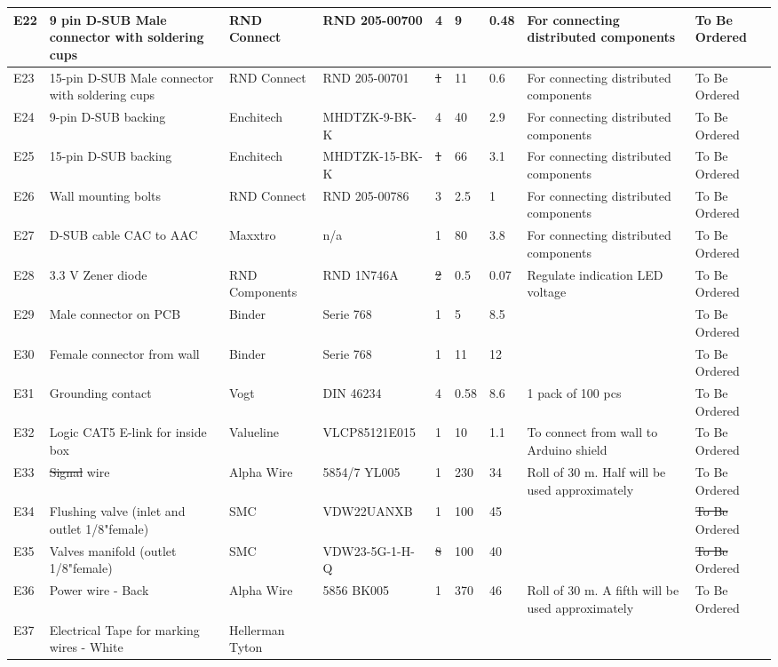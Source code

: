 \documentclass[a4paper,12pt,twoside]{article}
\providecommand{\DIFaddtex}[1]{{\protect\color{blue}\uwave{#1}}} %
\providecommand{\DIFdeltex}[1]{{\protect\color{red}\sout{#1}}}                      %
\providecommand{\DIFaddbegin}{} %
\providecommand{\DIFaddend}{} %
\providecommand{\DIFdelbegin}{} %
\providecommand{\DIFdelend}{} %
\providecommand{\DIFadd}[1]{\texorpdfstring{\DIFaddtex{#1}}{#1}} %
\providecommand{\DIFdel}[1]{\texorpdfstring{\DIFdeltex{#1}}{}} %
\newcommand{\DIFscaledelfig}{0.5}
\newlength{\DIFdelgraphicswidth} %
\newlength{\DIFdelgraphicsheight} %
\newcommand{\DIFaddincludegraphics}[2][]{{\color{blue}\fbox{\DIFOincludegraphics[#1]{#2}}}} %
\newcommand{\DIFdelincludegraphics}[2][]{%
\sbox{\DIFdelgraphicsbox}{\DIFOincludegraphics[#1]{#2}}%
\settoboxwidth{\DIFdelgraphicswidth}{\DIFdelgraphicsbox} %
\settoboxtotalheight{\DIFdelgraphicsheight}{\DIFdelgraphicsbox} %
\scalebox{\DIFscaledelfig}{%
\parbox[b]{\DIFdelgraphicswidth}{\usebox{\DIFdelgraphicsbox}\\[-\baselineskip] \rule{\DIFdelgraphicswidth}{0em}}\llap{\resizebox{\DIFdelgraphicswidth}{\DIFdelgraphicsheight}{%
\setlength{\unitlength}{\DIFdelgraphicswidth}%
\begin{picture}(1,1)%
\thicklines\linethickness{2pt} %
{\color[rgb]{1,0,0}\put(0,0){\framebox(1,1){}}}%
{\color[rgb]{1,0,0}\put(0,0){\line( 1,1){1}}}%
{\color[rgb]{1,0,0}\put(0,1){\line(1,-1){1}}}%
\end{picture}%
}\hspace*{3pt}}} %
} %
\DeclareRobustCommand{\DIFaddbegin}{\DIFOaddbegin \let\includegraphics\DIFaddincludegraphics} %
\DeclareRobustCommand{\DIFaddend}{\DIFOaddend \let\includegraphics\DIFOincludegraphics} %
\DeclareRobustCommand{\DIFdelbegin}{\DIFOdelbegin \let\includegraphics\DIFdelincludegraphics} %
\DeclareRobustCommand{\DIFdelend}{\DIFOaddend \let\includegraphics\DIFOincludegraphics} %
\begin{document}
\begin{landscape}
\begin{longtable} {|m{}|m{}|m{}|m{}|m{}|m{}|m{}|m{}|m{}|}
\hline E22 & 9 pin D-SUB Male connector with soldering cups & RND Connect & RND 205-00700 & 4 & 9 & 0.48 & For connecting distributed components & To Be Ordered \\ \hline E23 & 15-pin D-SUB Male connector with soldering cups & RND Connect & RND 205-00701 & \DIFdelbegin \DIFdel{1 }\DIFdelend \DIFaddbegin \DIFadd{2 }\DIFaddend & 11 & 0.6 & For connecting distributed components & To Be Ordered \\ \hline E24 & 9-pin D-SUB backing & Enchitech & MHDTZK-9-BK-K & 4 & 40 & 2.9 & For connecting distributed components & To Be Ordered \\ \hline E25 & 15-pin D-SUB backing & Enchitech & MHDTZK-15-BK-K & \DIFdelbegin \DIFdel{1 }\DIFdelend \DIFaddbegin \DIFadd{2 }\DIFaddend & 66 & 3.1 & For connecting distributed components & To Be Ordered \\ \hline E26 & Wall mounting bolts & RND Connect & RND 205-00786 & 3 & 2.5 & 1 & For connecting distributed components & To Be Ordered \\ \hline E27 & D-SUB cable CAC to AAC & Maxxtro & n/a & 1 & 80 & 3.8 & For connecting distributed components & To Be Ordered \\ \hline E28 & 3.3 V Zener diode & RND Components & RND 1N746A & \DIFdelbegin \DIFdel{2 }\DIFdelend \DIFaddbegin \DIFadd{15 }\DIFaddend & 0.5 & 0.07 & Regulate indication LED voltage & To Be Ordered \\ \hline E29 & Male connector on PCB & Binder & Serie 768 & 1 & 5 & 8.5 &  & To Be Ordered \\ \hline E30 & Female connector from wall & Binder & Serie 768 & 1 & 11 & 12 &  & To Be Ordered \\ \hline E31 & Grounding contact & Vogt & DIN 46234 & 4 & 0.58 & 8.6 & 1 pack of 100 pcs & To Be Ordered \\ \hline E32 & Logic CAT5 E-link for inside box & Valueline & VLCP85121E015 & 1 & 10 & 1.1 & To connect from wall to Arduino shield & To Be Ordered \\ \hline E33 & \DIFdelbegin \DIFdel{Signal }\DIFdelend \DIFaddbegin \DIFadd{Singal }\DIFaddend wire & Alpha Wire & 5854/7 YL005 & 1 & 230 & 34 & Roll of 30 m. Half will be used approximately & To Be Ordered \\ \hline E34 & Flushing valve (inlet and outlet 1/8"\DIFaddbegin \DIFadd{" }\DIFaddend female) & SMC & VDW22UANXB & 1 & 100 & 45 &  & \DIFdelbegin \DIFdel{To Be }\DIFdelend Ordered \\ \hline E35 & Valves manifold (outlet 1/8"\DIFaddbegin \DIFadd{" }\DIFaddend female) & SMC & VDW23-5G-1-H-Q & \DIFdelbegin \DIFdel{8 }\DIFdelend \DIFaddbegin \DIFadd{6 }\DIFaddend & 100 & 40 &  & \DIFdelbegin \DIFdel{To Be }\DIFdelend Ordered \\ \hline E36 & Power wire - Back & Alpha Wire & 5856 BK005 & 1 & 370 & 46 & Roll of 30 m. A fifth will be used approximately & To Be Ordered \\ \hline E37 & Electrical Tape for marking wires - White & Hellerman Tyton & 
\end{longtable}
\end{landscape}
\end{document}
